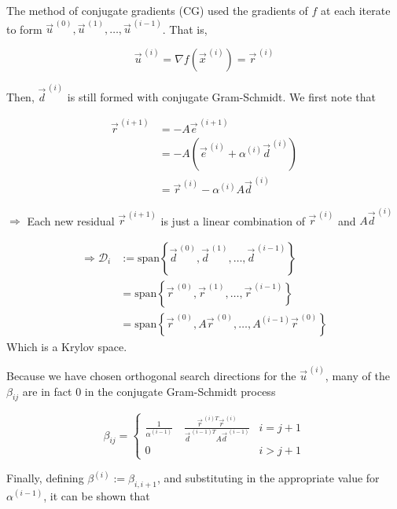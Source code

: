 The method of conjugate gradients (CG) used the gradients of $f$ at each iterate to form $\vec{u}^{\,(0)}, \vec{u}^{\,(1)}, \ldots, \vec{u}^{\,(i-1)}$. That is,

\begin{equation*}
\vec{u}^{\,(i)} = \nabla f \left( \vec{x}^{\,(i)} \right) = \vec{r}^{\,(i)}
\end{equation*}

Then, $\vec{d}^{\,(i)}$ is still formed with conjugate Gram-Schmidt. We first note that

\begin{align*}
    \vec{r}^{\,(i+1)} &= -A\vec{e}^{\,(i+1)} \\
    &= -A\left(\vec{e}^{\,(i)} + \alpha^{(i)}\vec{d}^{\,(i)} \right)\\
    &= \vec{r}^{\,(i)} - \alpha^{(i)}A\vec{d}^{\,(i)}
\end{align*}

$\Rightarrow$ Each new residual $\vec{r}^{\,(i+1)}$ is just a linear combination of $\vec{r}^{\,(i)}$ and $A\vec{d}^{\,(i)}$

\begin{align*}
    \Rightarrow \mathcal{D}_i &:=
    \text{span}
    \left\{
    \vec{d}^{\,(0)},
    \vec{d}^{\,(1)},
    \ldots ,
    \vec{d}^{\,(i-1)}
    \right\}
    \\
    &=
    \text{span}
    \left\{
    \vec{r}^{\,(0)},
    \vec{r}^{\,(1)},
    \ldots ,
    \vec{r}^{\,(i-1)}
    \right\}
    \\
    &=
    \text{span}
    \left\{
    \vec{r}^{\,(0)},
    A\vec{r}^{\,(0)},
    \ldots ,
    A^{(i-1)}\vec{r}^{\,(0)}
    \right\}
\end{align*}
Which is a Krylov space.

Because we have chosen orthogonal search directions for the $\vec{u}^{\,(i)}$, many of the $\beta_{ij}$ are in fact 0 in the conjugate Gram-Schmidt process

\begin{equation*}
    \beta_{ij} =
    \begin{cases}
        \frac{1}{\alpha^{(i-1)}} \quad \frac{\vec{r}^{\,(i)T}\vec{r}^{\,(i)}}
        {\vec{d}^{\,(i-1)T}A\vec{d}^{\,(i-1)}}& i=j+1 \\
        0 & i>j+1
    \end{cases}
\end{equation*}

Finally, defining $\beta^{(i)}:=\beta_{i, i+1}$, and substituting in the appropriate value for $\alpha^{(i-1)}$, it can be shown that

